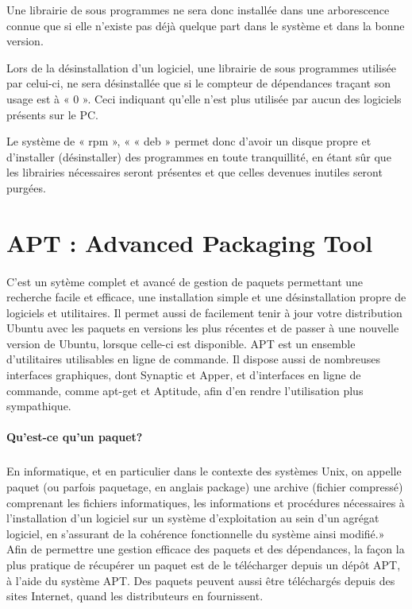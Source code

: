 \documentclass[a4paper,10pt]{article}
\begin{document}
Une librairie de sous programmes ne sera donc installée dans une arborescence connue que si elle n’existe pas déjà quelque part dans le système et dans la bonne version.

Lors de la désinstallation d’un logiciel, une librairie de sous programmes utilisée par celui-ci, ne sera désinstallée que si le compteur de dépendances traçant son usage est à « 0 ». Ceci indiquant qu’elle n’est plus utilisée par aucun des logiciels présents sur le PC.

Le système de « rpm », « « deb » permet donc d’avoir un disque propre et d’installer (désinstaller) des programmes en toute tranquillité, en étant sûr que les librairies nécessaires seront présentes et que celles devenues inutiles seront purgées.


\section{APT : Advanced Packaging Tool}
\paragraph{}
C'est un sytème complet et avancé de gestion de paquets permettant une recherche facile et efficace, une installation simple et une désinstallation propre de logiciels et utilitaires. 
Il permet aussi de facilement tenir à jour votre distribution Ubuntu avec les paquets en versions les plus récentes et de passer à une nouvelle version de Ubuntu, lorsque celle-ci est disponible.
APT est un ensemble d'utilitaires utilisables en ligne de commande. Il dispose aussi de nombreuses interfaces graphiques, dont Synaptic et Apper, et d'interfaces en ligne de commande, comme apt-get 
et Aptitude, afin d'en rendre l'utilisation plus sympathique.

\paragraph{Qu'est-ce qu'un paquet?}
\subparagraph{}
En informatique, et en particulier dans le contexte des systèmes Unix, on appelle paquet (ou parfois paquetage, en anglais package) une archive (fichier compressé) comprenant les fichiers informatiques, 
les informations et procédures nécessaires à l'installation d'un logiciel sur un système d'exploitation au sein d'un agrégat logiciel, en s'assurant de la cohérence fonctionnelle du système ainsi modifié.» 	
Afin de permettre une gestion efficace des paquets et des dépendances, la façon la plus pratique de récupérer un paquet est de le télécharger depuis un dépôt APT, à l'aide du système APT. Des paquets 
peuvent aussi être téléchargés depuis des sites Internet, quand les distributeurs en fournissent.
\end{document}

